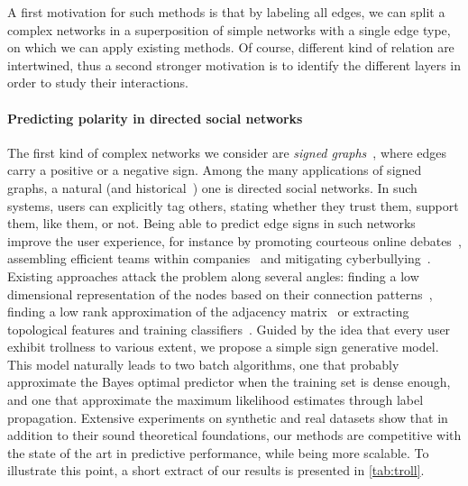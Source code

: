A first motivation for such methods is that by labeling all edges, we can split a complex networks
in a superposition
of simple networks with a single edge type, on which we can apply existing methods. Of course,
different kind of relation are intertwined, thus a second stronger motivation is to identify the
different layers in order to study their interactions.

\vspace{-\baselineskip}
\paragraph{Predicting polarity in directed social networks}

The first kind of complex networks we consider are \emph{signed graphs}~\autocite{Tang2015a},
where edges carry a positive or a negative sign. Among the many applications of signed graphs, a
natural (and historical~\autocite{harary1953}) one is directed social networks. In such systems,
users can explicitly tag others, stating whether they trust them, support them, like them, or not.
Being able to predict edge signs in such networks improve the user experience, for instance by
promoting courteous online debates~\autocite{journalism15}, assembling efficient teams within
companies~\autocite{MLinHR16} and mitigating cyberbullying~\autocite{cyberbullying13}. Existing
approaches attack the problem along several angles: finding a low dimensional representation of the
nodes based on their connection patterns~\autocites{SIGNet17}{SNE17}, finding a low rank approximation
of the adjacency matrix~\autocites{LowRankCompletion14}{OnlineCompletion17} or extracting
topological features and training classifiers~\autocites{Leskovec2010}{Bayesian15}{wu2016troll}.
Guided by the idea that every user exhibit trollness to various extent, we propose a simple sign
generative model. This model naturally leads to two batch algorithms, one that probably approximate the
Bayes optimal predictor when the training set is dense enough, and one that approximate the maximum
likelihood estimates through label propagation. Extensive experiments on synthetic and real datasets
show that in addition to their sound theoretical foundations, our methods are competitive with the
state of the art in predictive performance, while being more scalable.
\iffalse
To illustrate this point, a
short extract of our results is presented in \autoref{tab:troll}.

